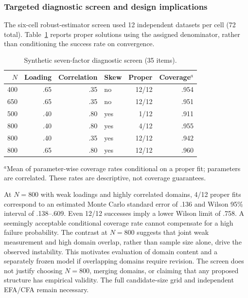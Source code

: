 \subsubsection{Targeted diagnostic screen and design implications}
The six-cell robust-estimator screen used 12 independent datasets per cell (72 total). Table~\ref{tab:diagnostic-screen} reports proper solutions using the assigned denominator, rather than conditioning the success rate on convergence.

\begin{table}[ht]
\centering\small
\caption{Synthetic seven-factor diagnostic screen (35 items).}
\label{tab:diagnostic-screen}
\begin{tabular}{rrrlrr}
\toprule
$N$ & Loading & Correlation & Skew & Proper & Coverage$^{a}$ \\
\midrule
400 & .65 & .35 & no & 12/12 & .954 \\
650 & .65 & .35 & no & 12/12 & .951 \\
500 & .40 & .80 & yes & 1/12 & .911 \\
800 & .40 & .80 & yes & 4/12 & .955 \\
800 & .40 & .35 & yes & 12/12 & .942 \\
800 & .65 & .80 & yes & 12/12 & .960 \\
\bottomrule
\end{tabular}

\smallskip
\begin{minipage}{.95\linewidth}\footnotesize
$^{a}$Mean of parameter-wise coverage rates conditional on a proper fit; parameters are correlated. These rates are descriptive, not coverage guarantees.
\end{minipage}
\end{table}

At $N=800$ with weak loadings and highly correlated domains, 4/12 proper fits correspond to an estimated Monte Carlo standard error of .136 and Wilson 95\% interval of .138--.609. Even 12/12 successes imply a lower Wilson limit of .758. A seemingly acceptable conditional coverage rate cannot compensate for a high failure probability. The contrast at $N=800$ suggests that joint weak measurement and high domain overlap, rather than sample size alone, drive the observed instability. This motivates evaluation of domain content and a separately frozen model if overlapping domains require revision. The screen does not justify choosing $N=800$, merging domains, or claiming that any proposed structure has empirical validity. The full candidate-size grid and independent EFA/CFA remain necessary.

